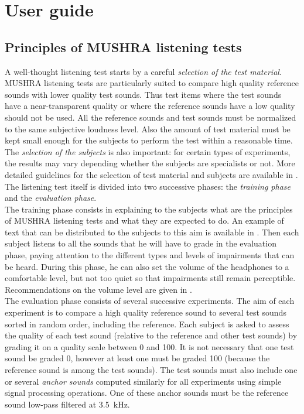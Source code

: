 \documentclass[11pt,a4paper]{book}
\begin{document}
\chapter{User guide}
\section{Principles of MUSHRA listening tests}
A well-thought listening test starts by a careful \textit{selection of the test material}. MUSHRA listening tests are particularly suited to compare high quality reference sounds with lower quality test sounds. Thus test items where the test sounds have a near-transparent quality or where the reference sounds have a low quality should not be used. All the reference sounds and test sounds must be normalized to the same subjective loudness level. Also the amount of test material must be kept small enough for the subjects to perform the test within a reasonable time. The \textit{selection of the subjects} is also important: for certain types of experiments, the results may vary depending whether the subjects are specialists or not. More detailed guidelines for the selection of test material and subjects are available in \cite{ITU03}.\\

The listening test itself is divided into two successive phases: the \textit{training phase} and the \textit{evaluation phase}.\\

The training phase consists in explaining to the subjects what are the principles of MUSHRA listening tests and what they are expected to do. An example of text that can be distributed to the subjects to this aim is available in \cite{ITU03}. Then each subject listens to all the sounds that he will have to grade in the evaluation phase, paying attention to the different types and levels of impairments that can be heard. During this phase, he can also set the volume of the headphones to a comfortable level, but not too quiet so that impairments still remain perceptible. Recommendations on the volume level are given in \cite{ITU03}.\\

The evaluation phase consists of several successive experiments. The aim of each experiment is to compare a high quality reference sound to several test sounds sorted in random order, including the reference. Each subject is asked to assess the quality of each test sound (relative to the reference and other test sounds) by grading it on a quality scale between 0 and 100. It is not necessary that one test sound be graded 0, however at least one must be graded 100 (because the reference sound is among the test sounds). The test sounds must also include one or several \textit{anchor sounds} computed similarly for all experiments using simple signal processing operations. One of these anchor sounds must be the reference sound low-pass filtered at 3.5~kHz.\\
\end{document}
